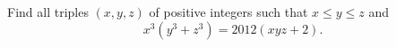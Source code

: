 Find all triples $(x,y,z)$ of positive integers such that $x \leq y \leq z$ and \[x^3(y^3+z^3)=2012(xyz+2).\]